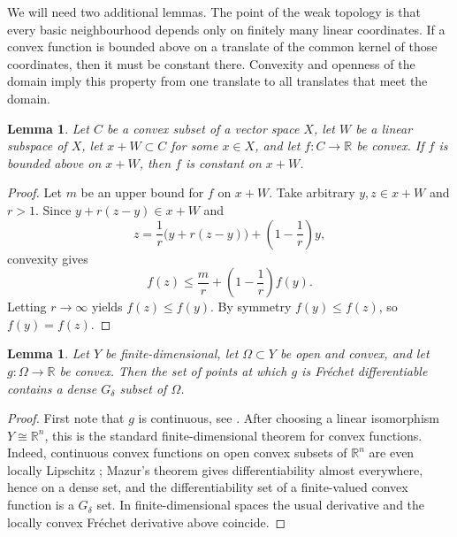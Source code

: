 \documentclass[12pt]{amsart}
\theoremstyle{plain}
\newtheorem{lemma}[theorem]{Lemma}
\theoremstyle{definition}
\theoremstyle{remark}
\def\R{{\mathbb R}}
\begin{document}
We will need two additional lemmas.  The point of the weak topology is that every basic neighbourhood depends only on finitely many linear coordinates.  If a convex function is bounded above on a translate of the common kernel of those coordinates, then it must be constant there.  Convexity and openness of the domain imply this property from one translate to all translates that meet the domain.
\begin{lemma}\label{le1}
Let $C$ be a convex subset of a vector space $X$, let $W$ be a linear subspace of $X$, let $x+W\subset C$ for some $x\in X$,  and let $f\colon C\to\R$ be convex.  If $f$ is bounded above on $x+W$, then $f$ is constant on $x+W$.
\end{lemma}
\begin{proof}
Let $m$ be an upper bound for $f$ on $x+W$.  Take arbitrary $y,z\in x+W$ and $r>1$.  Since $y+r(z-y)\in x+W$ and
$$z=\frac1r\bigl(y+r(z-y)\bigr)+\left(1-\frac1r\right)y,$$
convexity gives
\[
        f(z)\leq \frac{m}{r}+\left(1-\frac1r\right)f(y).
\]
Letting $r\to\infty$ yields $f(z)\leq f(y)$.  By symmetry $f(y)\leq f(z)$, so $f(y)=f(z)$.
\end{proof}
\begin{lemma}\label{le2}
Let $Y$ be finite-dimensional, let $\Omega\subset Y$ be open and convex, and let $g\colon\Omega\to\R$ be  convex.  Then the set of points at which $g$ is Fr\'echet differentiable contains a dense $G_\delta$ subset of $\Omega$.
\end{lemma}
\begin{proof}
First note that $g$ is continuous, see \cite[page 11]{p}. After choosing a linear isomorphism $Y\cong\R^n$, this is the standard finite-dimensional theorem for convex functions.  Indeed, continuous convex functions on open convex subsets of $\R^n$ are even locally Lipschitz \cite[pp. 4,5]{p}; Mazur's theorem \cite[Theorem 1.20]{p}  gives differentiability almost everywhere, hence on a dense set, and the differentiability set of a finite-valued convex function is a $G_\delta$ set.  In finite-dimensional spaces the usual derivative and the locally convex Fr\'echet derivative above coincide.
\end{proof}
\end{document}
